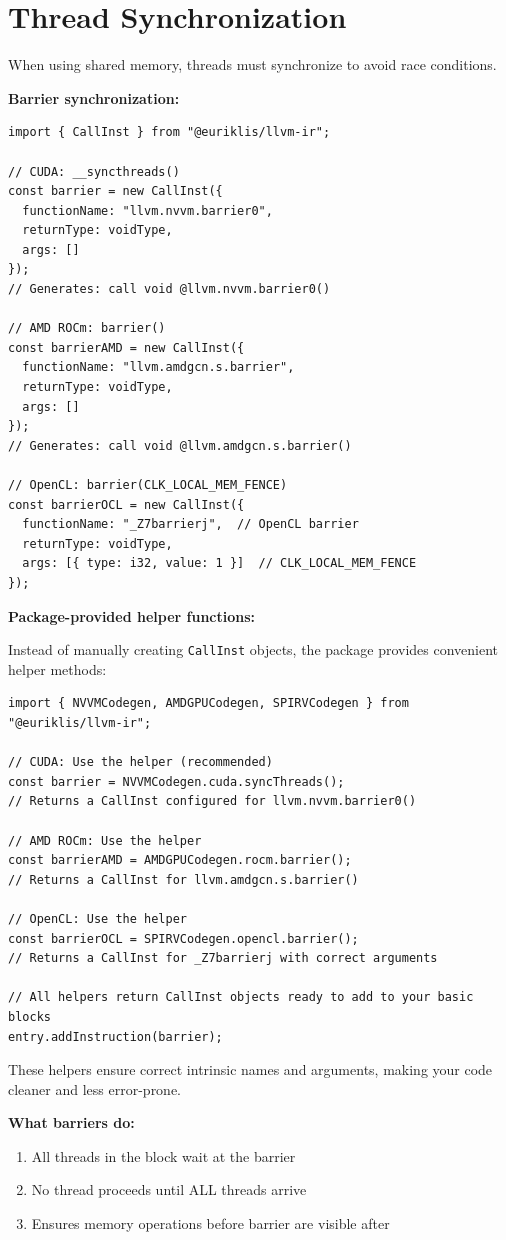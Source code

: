 \section{Thread Synchronization}

When using shared memory, threads must synchronize to avoid race conditions.

\textbf{Barrier synchronization:}
\begin{lstlisting}[style=ts]
import { CallInst } from "@euriklis/llvm-ir";

// CUDA: __syncthreads()
const barrier = new CallInst({
  functionName: "llvm.nvvm.barrier0",
  returnType: voidType,
  args: []
});
// Generates: call void @llvm.nvvm.barrier0()

// AMD ROCm: barrier()
const barrierAMD = new CallInst({
  functionName: "llvm.amdgcn.s.barrier",
  returnType: voidType,
  args: []
});
// Generates: call void @llvm.amdgcn.s.barrier()

// OpenCL: barrier(CLK_LOCAL_MEM_FENCE)
const barrierOCL = new CallInst({
  functionName: "_Z7barrierj",  // OpenCL barrier
  returnType: voidType,
  args: [{ type: i32, value: 1 }]  // CLK_LOCAL_MEM_FENCE
});
\end{lstlisting}

\textbf{Package-provided helper functions:}

Instead of manually creating \texttt{CallInst} objects, the package provides convenient helper methods:

\begin{lstlisting}[style=ts]
import { NVVMCodegen, AMDGPUCodegen, SPIRVCodegen } from "@euriklis/llvm-ir";

// CUDA: Use the helper (recommended)
const barrier = NVVMCodegen.cuda.syncThreads();
// Returns a CallInst configured for llvm.nvvm.barrier0()

// AMD ROCm: Use the helper
const barrierAMD = AMDGPUCodegen.rocm.barrier();
// Returns a CallInst for llvm.amdgcn.s.barrier()

// OpenCL: Use the helper
const barrierOCL = SPIRVCodegen.opencl.barrier();
// Returns a CallInst for _Z7barrierj with correct arguments

// All helpers return CallInst objects ready to add to your basic blocks
entry.addInstruction(barrier);
\end{lstlisting}

These helpers ensure correct intrinsic names and arguments, making your code cleaner and less error-prone.

\textbf{What barriers do:}
\begin{enumerate}[noitemsep]
  \item All threads in the block wait at the barrier
  \item No thread proceeds until ALL threads arrive
  \item Ensures memory operations before barrier are visible after
\end{enumerate}

